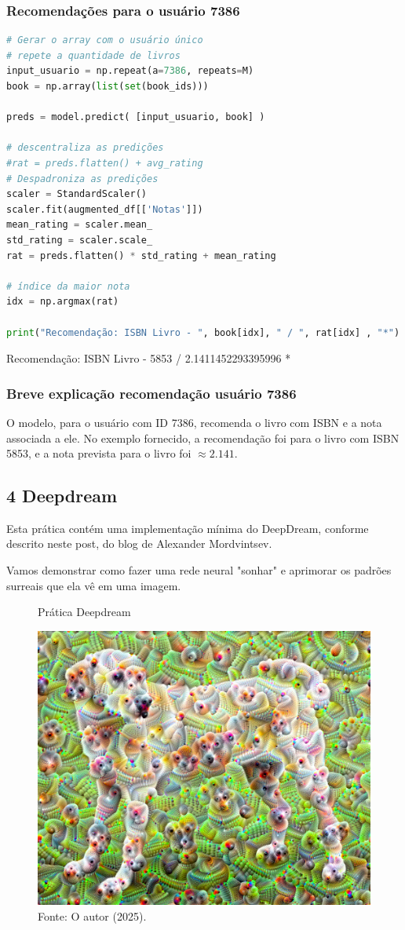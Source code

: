 \subsubsection*{Recomendações para o usuário 7386}
\begin{lstlisting}[language=Python, style=input]
# Gerar o array com o usuário único
# repete a quantidade de livros
input_usuario = np.repeat(a=7386, repeats=M)
book = np.array(list(set(book_ids)))

preds = model.predict( [input_usuario, book] )

# descentraliza as predições
#rat = preds.flatten() + avg_rating
# Despadroniza as predições
scaler = StandardScaler()
scaler.fit(augmented_df[['Notas']])
mean_rating = scaler.mean_
std_rating = scaler.scale_
rat = preds.flatten() * std_rating + mean_rating

# índice da maior nota
idx = np.argmax(rat)

print("Recomendação: ISBN Livro - ", book[idx], " / ", rat[idx] , "*")
\end{lstlisting}
\begin{tcolorbox}[myoutputstyle]
Recomendação: ISBN Livro -  5853  /  2.1411452293395996 *
\end{tcolorbox}
\subsubsection*{Breve explicação recomendação usuário 7386}
O modelo, para o usuário com ID 7386, recomenda o livro com ISBN e a nota associada a ele. No exemplo fornecido, a recomendação foi para o livro com ISBN 5853, e a nota prevista para o livro foi $\approx2.141$.

\subsection*{\textbf{4 Deepdream}}
Esta prática contém uma implementação mínima do DeepDream, conforme descrito neste post, do blog de Alexander Mordvintsev.

Vamos demonstrar como fazer uma rede neural "sonhar" e aprimorar os padrões surreais que ela vê em uma imagem.
\begin{figure}[H]
\centering
\caption{Prática Deepdream}
\includegraphics[width=.8\linewidth]{apendices/fig/13_IAA012_10.png}
\caption*{Fonte: O autor (2025).}
\end{figure}
